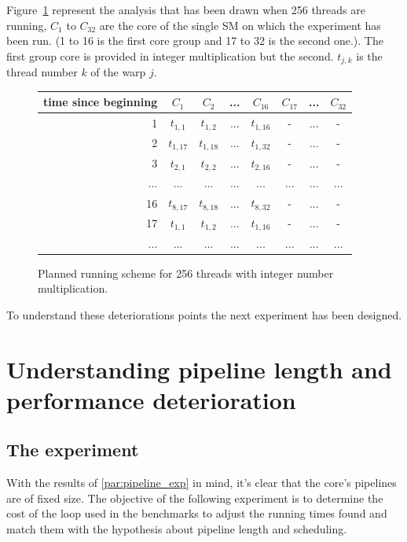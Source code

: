 \documentclass{article}
\begin{document}
   Figure~\ref{fig:int_prediction_256} represent the analysis that has been drawn when 256 threads are running, $C_1$ to $C_{32}$ are the core of the single SM on which the experiment has been run. (1 to 16 is the first core group and 17 to 32 is the second one.). The first group core is provided in integer multiplication but the second. $t_{j,k}$ is the thread number $k$ of the warp $j$.
   \begin{figure}[h]
      \centering
       \begin{tabular}{ | r || c | c | c | c || c | c | c | }
    	    \hline
    	    time since beginning & $C_1$ & $C_2$ & ... & $C_{16}$ & $C_{17}$ & ... & $C_{32}$ \\ \hline  \hline
    	   1 & $t_{1,1}$ & $t_{1,2}$ & ... & $t_{1,16}$ & - & ... & - \\ \hline 
    	   2 & $t_{1,17}$ & $t_{1,18}$ & ... & $t_{1,32}$ & - & ... & - \\ \hline
    	   3 & $t_{2,1}$ & $t_{2,2}$ & ... & $t_{2,16}$ & - & ... & - \\ \hline
    	   ... & ... & ... & ... & ... & ... & ... & ... \\ \hline
    	   16 & $t_{8,17}$ & $t_{8,18}$ & ... & $t_{8,32}$ & - & ... & - \\ \hline
    	   17 & $t_{1,1}$ & $t_{1,2}$ & ... & $t_{1,16}$ & - & ... & - \\ \hline
    	   ... & ... & ... & ... & ... & ... & ... & ... \\ \hline
  	\end{tabular}
  	\captionsetup{justification=centering}
  	\caption{Planned running scheme for 256 threads with integer number multiplication.}
  	\label{fig:int_prediction_256}
   \end{figure}

    To understand these deteriorations points the next experiment has been designed.

\section{Understanding pipeline length and performance deterioration}
    \subsection{The experiment}
    With the results of \ref{par:pipeline_exp} in mind, it's clear that the core's pipelines
    are of fixed size. The objective of the following experiment is to determine the cost of
    the loop used in the benchmarks to adjust the running times found and match them with
    the hypothesis about pipeline length and scheduling. 
\end{document}
